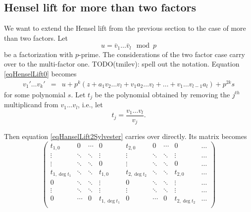 \documentclass{article}
\begin{document}
\subsection{Hensel lift for more than two factors}
We want to extend the Hensel lift from the previous section to the case of more than two factors. Let
\[
u = \bar v_1 \dots \bar v_l \mod p
\]
be a factorization with \(p\)-prime. The considerations of the two factor case carry over to the multi-factor one. TODO(tmilev): spell out the notation. Equation \eqref{eqHenselLift0} becomes
\[
\begin{array}{rcl}
v_1'\dots v_k'& = & u + p^k \left(z+ a_1 v_2\dots v_l + v_1 a_2\dots v_l +\dots + v_1\dots v_{l-1} a_l   \right) +p^{2k} s
\end{array}
\]
for some polynomial $s$. Let $t_j$ be the polynomial obtained by removing the $j^{th}$ multiplicand from $v_1\dots v_l$, i.e., let
\[t_j=\frac{v_1\dots v_l}{v_j}. \]

Then equation \eqref{eqHanselLift2Sylvester} carries over directly. Its matrix becomes
\[
\left( \begin{array}{ccccccccccc}
t_{1,0}       & 0      & \cdots & 0              & t_{2,0}       & 0      & \cdots & 0              & \dots \\
\vdots        & \ddots & \ddots & \vdots         & \vdots        & \ddots & \ddots & \vdots         & \dots \\
\vdots        & \ddots & \ddots & 0              & \vdots        & \ddots & \ddots & 0              & \dots \\
t_{1,\deg t_1}& \ddots & \ddots & t_{1,0}        & t_{2,\deg t_2}& \ddots & \ddots & t_{2,0}        & \dots \\
0             & \ddots & \ddots & \vdots         & 0             & \ddots & \ddots & \vdots         & \dots \\
\vdots        & \ddots & \ddots & \vdots         & \vdots        & \ddots & \ddots & \vdots         & \dots \\
0             & \cdots & 0      & t_{1,\deg t_1} & 0             & \cdots & 0      & t_{2,\deg t_2} & \dots \\
\end{array}\right)\]
\end{document}
